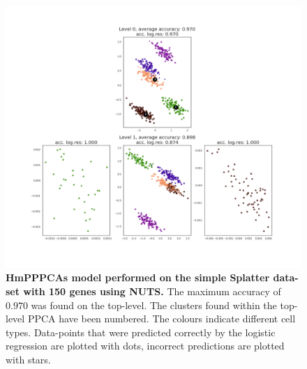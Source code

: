 \begin{figure}
    \centering
    \includegraphics[width=\linewidth]{figs/simple_150_nuts.png}
    \caption[HmPPPCAs model performed on the simple Splatter data-set with 150 genes using NUTS]{\small \textbf{HmPPPCAs model performed on the simple Splatter data-set with 150 genes using NUTS.} \small The maximum accuracy of $0.970$ was found on the top-level. The clusters found within the top-level PPCA have been numbered. The colours indicate different cell types. Data-points that were predicted correctly by the logistic regression are plotted with dots, incorrect predictions are plotted with stars.}
    \label{fig:simple_150_nuts}
\end{figure}

